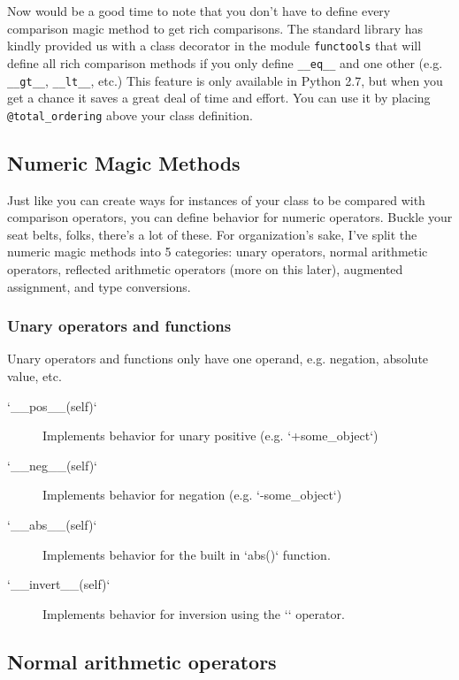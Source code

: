 \documentclass[a4paper,11pt]{article}
\newcommand{\code}[1]{\texttt{#1}}
\begin{document}
Now would be a good time to note that you don't have to define every comparison magic method to get rich comparisons. The standard library has kindly provided us with a class decorator in the module \code{functools} that will define all rich comparison methods if you only define \code{__eq__} and one other (e.g. \code{__gt__}, \code{__lt__}, etc.) This feature is only available in Python 2.7, but when you get a chance it saves a great deal of time and effort. You can use it by placing \code{@total_ordering} above your class definition.

\subsection{Numeric Magic Methods}

Just like you can create ways for instances of your class to be compared with comparison operators, you can define behavior for numeric operators. Buckle your seat belts, folks, there's a lot of these. For organization's sake, I've split the numeric magic methods into 5 categories: unary operators, normal arithmetic operators, reflected arithmetic operators (more on this later), augmented assignment, and type conversions.

\subsubsection{Unary operators and functions}

Unary operators and functions only have one operand, e.g. negation, absolute value, etc.

\begin{description}

\item[`__pos__(self)`]
Implements behavior for unary positive (e.g. `+some_object`)
\item[`__neg__(self)`]
Implements behavior for negation (e.g. `-some_object`)
\item[`__abs__(self)`]
Implements behavior for the built in `abs()` function.
\item[`__invert__(self)`]
Implements behavior for inversion using the `` operator.

\end{description}

\subsection{Normal arithmetic operators}
\end{document}
